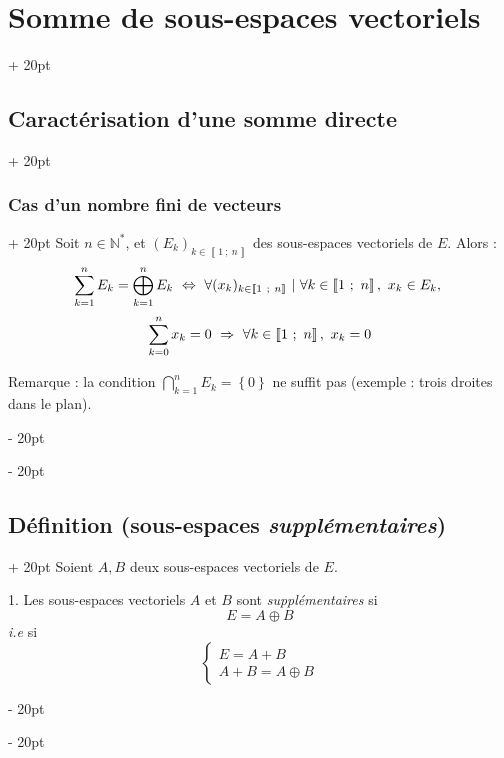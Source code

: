 \documentclass[a4paper, 12pt, twoside]{article}
\newcommand{\N}{\mathbb{N}} %
\newcommand{\nset}[2]{\left\llbracket #1\ ;\ #2 \right\rrbracket}
\newcommand{\set}[1]{\left\{ #1 \right\}}
\newcommand{\ssi}{\ \Leftrightarrow \ }
\newcommand{\eqsys}[2]{\begin{cases} #1 \\ #2 \end{cases}}
\newcommand{\ind}[1][20pt]{\advance\leftskip + #1}
\newcommand{\deind}[1][20pt]{\advance\leftskip - #1}
\newenvironment{indt}[2][20pt]{#2 \par \ind[#1]}{\par \deind} %
\begin{document}
\begin{indt}{\section{Somme de sous-espaces vectoriels}}
\begin{indt}{\subsection{Caractérisation d'une somme directe}}
            \begin{indt}{\subsubsection{Cas d'un nombre fini de vecteurs}}
                Soit $n \in \N^*$, et $(E_k)_{k \in \nset 1 n}$ des sous-espaces vectoriels de $E$. Alors :
                    \[
                        \begin{array}{c}
                            \displaystyle \sum_{k = 1}^n E_k = \bigoplus_{k = 1}^n E_k
                            \vspace{6pt}
                            \displaystyle
                            \ssi
                            \forall (x_k)_{k \in \nset 1 n}\ |\
                            \forall k \in \nset 1 n,\ x_k \in E_k,\
                            \\
                            \displaystyle
                            \sum_{k = 0}^n x_k = 0\ \Rightarrow\ \forall k \in \nset 1 n,\ x_k = 0
                        \end{array}
                    \]
                
                Remarque : la condition
                    $\displaystyle \bigcap_{k = 1}^n E_k = \set 0 $
                ne suffit pas (exemple : trois droites dans le plan).
            \end{indt}
        \end{indt}
        
        \vspace{12pt}
        
        \begin{indt}{\subsection{Définition (sous-espaces \textit{supplémentaires})}}
            Soient $A, B$ deux sous-espaces vectoriels de $E$.
            
            \vspace{6pt}
            
            1. Les sous-espaces vectoriels $A$ et $B$ sont \textit{supplémentaires} si
                \[ E = A \oplus B \]
            \textit{i.e} si
                \[ \eqsys{E = A + B}{A + B = A \oplus B} \]
            
            \vspace{12pt}
            

\end{indt}
\end{indt}
\end{document}
